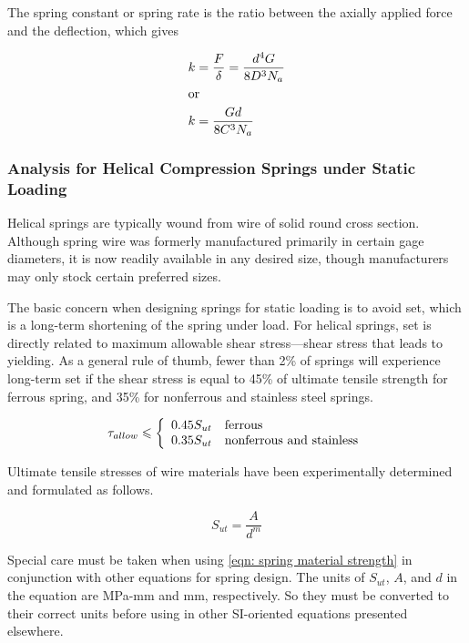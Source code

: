 \documentclass[a4paper,openany,nobib]{tufte-book}
\begin{document}
{{The spring constant or spring rate is the ratio between the axially
applied force and the deflection, which gives

\begin{gather}
\label{eqn: spring constant}
  k = \frac{F}{\delta} = \frac{d^4G}{8D^3N_a} \hfill \\
  \text{or} \hfill \\
  k = \frac{Gd}{8C^3N_a} \hfill \\ 
\end{gather}

\subsubsection{Analysis for Helical Compression Springs under Static Loading}
\label{analysis-for-helical-compression-springs-under-static-loading}
Helical springs are typically wound from wire of solid round cross
section. Although spring wire was formerly manufactured primarily in
certain gage diameters, it is now readily available in any desired size,
though manufacturers may only stock certain preferred sizes.

The basic concern when designing springs for static loading is to avoid
set, which is a long-term shortening of the spring under load. For
helical springs, set is directly related to maximum allowable shear
stress---shear stress that leads to yielding. As a general rule of
thumb, fewer than 2\% of springs will experience long-term set if the
shear stress is equal to 45\% of ultimate tensile strength for ferrous
spring, and 35\% for nonferrous and stainless steel springs.

$$\tau_{allow} \leqslant \left\{
    \begin{array}{ll}
       0.45 S_{ut} & \text{ferrous} \hfill \\ 
       0.35 S_{ut} & \text{nonferrous and stainless} 
     \end{array} \right.$$

Ultimate tensile stresses of wire materials have been experimentally
determined and formulated as follows.

$$S_{ut} = \frac{A}{d^m}$$

Special care must be taken when using
\ref{eqn: spring material strength} in
conjunction with other equations for spring design. The units of
\(S_{ut}\), \(A\), and \(d\) in the equation are MPa-mm and mm, respectively.
So they must be converted to their correct units before using in other
SI-oriented equations presented elsewhere.

}}
\end{document}
